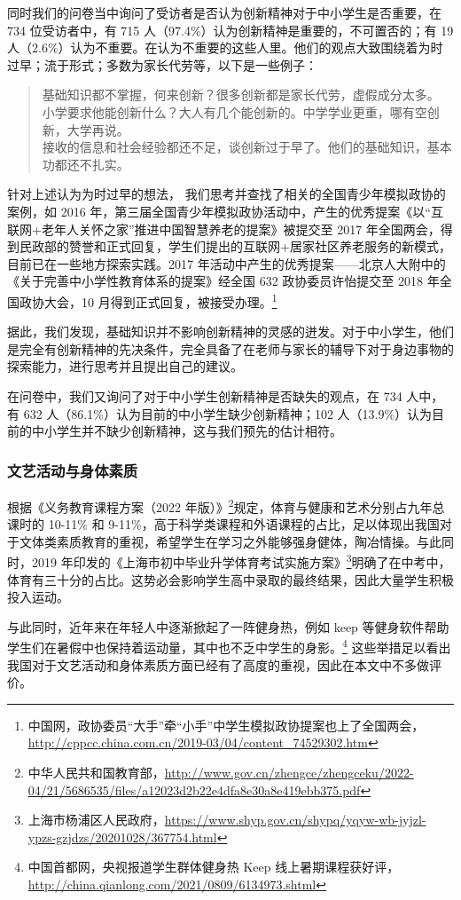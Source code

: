 \documentclass[12pt,UTF8]{ctexart}
\begin{document}
\par {
	同时我们的问卷当中询问了受访者是否认为创新精神对于中小学生是否重要，在 734 位受访者中，有 715 人（97.4\%）认为创新精神是重要的，不可置否的；有
	19 人（2.6\%）认为不重要。在认为不重要的这些人里。他们的观点大致围绕着为时过早；流于形式；多数为家长代劳等，以下是一些例子：
	\begin{quote}
		\kaishu 
		基础知识都不掌握，何来创新？很多创新都是家长代劳，虚假成分太多。\\
		小学要求他能创新什么？大人有几个能创新的。中学学业更重，哪有空创新，大学再说。\\
		接收的信息和社会经验都还不足，谈创新过于早了。他们的基础知识，基本功都还不扎实。
	\end{quote}
}
\par {
	针对上述认为为时过早的想法， 我们思考并查找了相关的全国青少年模拟政协的案例，如 2016
	年，第三届全国青少年模拟政协活动中，产生的优秀提案《以“互联网+老年人关怀之家”推进中国智慧养老的提案》被提交至 2017
	年全国两会，得到民政部的赞誉和正式回复，学生们提出的互联网+居家社区养老服务的新模式，目前已在一些地方探索实践。2017
	年活动中产生的优秀提案——北京人大附中的《关于完善中小学性教育体系的提案》经全国 632 政协委员许怡提交至 2018 年全国政协大会，10
	月得到正式回复，被接受办理。\footnote{中国网，政协委员“大手”牵“小手”中学生模拟政协提案也上了全国两会，\url{http://cppcc.china.com.cn/2019-03/04/content_74529302.htm}}
}
\par {
	
	据此，我们发现，基础知识并不影响创新精神的灵感的迸发。对于中小学生，他们是完全有创新精神的先决条件，完全具备了在老师与家长的辅导下对于身边事物的探索能力，进行思考并且提出自己的建议。
}
\par {
	在问卷中，我们又询问了对于中小学生创新精神是否缺失的观点，在 734 人中，有 632 人（86.1\%）认为目前的中小学生缺少创新精神；102
	人（13.9\%）认为目前的中小学生并不缺少创新精神，这与我们预先的估计相符。
}

\subsubsection {文艺活动与身体素质}
\par {
	
	根据《义务教育课程方案（2022 年版）》\footnote{中华人民共和国教育部，\url{http://www.gov.cn/zhengce/zhengceku/2022-04/21/5686535/files/a12023d2b22e4dfa8e30a8e419ebb375.pdf}}规定，体育与健康和艺术分别占九年总课时的
	10-11\% 和
	9-11\%，高于科学类课程和外语课程的占比，足以体现出我国对于文体类素质教育的重视，希望学生在学习之外能够强身健体，陶冶情操。与此同时，2019
	年印发的《上海市初中毕业升学体育考试实施方案》\footnote{上海市杨浦区人民政府，\url{https://www.shyp.gov.cn/shypq/yqyw-wb-jyjzl-ypzs-gzjdzs/20201028/367754.html}}明确了在中考中，体育有三十分的占比。这势必会影响学生高中录取的最终结果，因此大量学生积极投入运动。
}
\par {
	与此同时，近年来在年轻人中逐渐掀起了一阵健身热，例如 keep
	等健身软件帮助学生们在暑假中也保持着运动量，其中也不乏中学生的身影。\footnote{中国首都网，央视报道学生群体健身热 Keep
		线上暑期课程获好评，\url{http://china.qianlong.com/2021/0809/6134973.shtml}}
	这些举措足以看出我国对于文艺活动和身体素质方面已经有了高度的重视，因此在本文中不多做评价。
}
\end{document}
